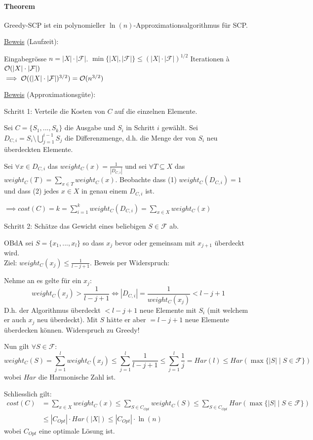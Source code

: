 \paragraph{Theorem}
Greedy-SCP ist ein polynomieller $\ln(n)$-Approximationsalgorithmus für SCP.

\underline{Beweis} (Laufzeit):

Eingabegrösse $n = |X| \cdot |\mathcal{F}|$.
$\min \{|X|, |\mathcal{F}| \} \leq (|X| \cdot |\mathcal{F}|)^{1/2}$ Iterationen
à $\mathcal{O} (|X| \cdot |\mathcal{F}|)$
\\
$\implies \mathcal{O} ((|X| \cdot |\mathcal{F}|)^{3/2}) = \mathcal{O} (n^{3/2})$

\underline{Beweis} (Approximationsgüte):

Schritt 1: Verteile die Kosten von $C$ auf die einzelnen Elemente.

Sei $C = \{ S_1, ..., S_k \}$ die Ausgabe und $S_i$ in Schritt $i$ gewählt.
Sei $D_{C,i} = S_i \setminus \bigcup_{j=1}^{i-1} S_j$ die Differenzmenge,
d.h. die Menge der von $S_i$ neu überdeckten Elemente.

Sei $\forall x \in D_{C,i}$ das $weight_C(x) = \frac{1}{|D_{C,i}|}$
und sei $\forall T \subseteq X$ das $weight_C(T) = \sum_{x \in T} weight_C(x)$.
Beobachte dass (1) $weight_C(D_{C,i}) = 1$ und dass (2) jedes $x \in X$ in genau einem $D_{C,i}$ ist.

$\implies cost(C) = k = \sum_{i=1}^k weight_C(D_{C,i}) = \sum_{x\in X} weight_C(x)$

Schritt 2: Schätze das Gewicht eines beliebigen $S \in \mathcal{F}$ ab.

OBdA sei $S= \{x_1, ..., x_l\}$ so dass $x_j$ bevor oder gemeinsam mit $x_{j+1}$ überdeckt wird. \\
Ziel: $weight_C(x_j) \leq \frac{1}{l-j+1}$.
Beweis per Widerspruch:

Nehme an es gelte für ein $x_j$:
$$ weight_C(x_j) > \frac{1}{l-j+1} \iff |D_{C,i}| = \frac{1}{weight_C(x_j)} < l-j+1 $$
D.h. der Algorithmus überdeckt $< l-j+1$ neue Elemente mit $S_i$ (mit welchem er auch $x_j$ neu überdeckt).
Mit $S$ hätte er aber $= l-j+1$ neue Elemente überdecken können.
Widerspruch zu Greedy!

Nun gilt $\forall S \in \mathcal{F}$:
$$ weight_C(S)
     = \sum_{j=1}^l weight_C(x_j)
  \leq \sum_{j=1}^l \frac{1}{l-j+1}
  \leq \sum_{j=1}^l \frac{1}{j}
     = Har(l)
  \leq Har(\max \{ |S| \; | \; S \in \mathcal{F} \} )
$$
wobei $Har$ die Harmonische Zahl ist.

Schliesslich gilt:
\begin{align*}
  cost(C)
     &= \sum_{x \in X} weight_C(x) %
  \leq \sum_{S \in C_{Opt}} weight_C(S) %
  \leq \sum_{S \in C_{Opt}} Har(\max \{ |S| \; | \; S \in \mathcal{F} \} ) \\
  &\leq |C_{Opt}| \cdot Har(|X|)
  \leq |C_{Opt}| \cdot \ln(n)
\end{align*}
wobei $C_{Opt}$ eine optimale Lösung ist.


